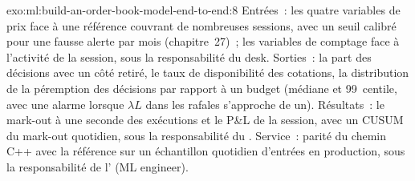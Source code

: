 \begin{solution}{exo:ml:build-an-order-book-model-end-to-end:8}
Entrées~: les quatre variables de prix face à une référence couvrant de nombreuses sessions, avec un seuil calibré pour une fausse alerte par mois
(chapitre~27)~; les variables de comptage face à l'activité de la session, sous la responsabilité du desk. Sorties~: la part des décisions avec un côté
retiré, le taux de disponibilité des cotations, la distribution de la péremption des décisions par rapport à un budget (médiane et 99~centile, avec une alarme lorsque
$\lambda L$ dans les rafales s'approche de un). Résultats~: le mark-out à une seconde des exécutions et le P\&L de la session, avec un CUSUM du
mark-out quotidien, sous la responsabilité du . Service~: parité du chemin C++ avec la référence sur un échantillon quotidien d'entrées en production, sous la responsabilité de
l' (ML engineer).
\end{solution}

